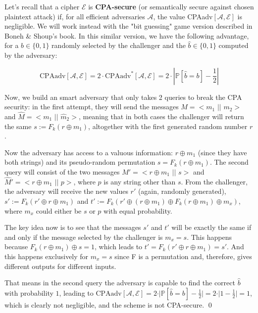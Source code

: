 Let's recall that a cipher $\mathcal{E}$ is \textbf{CPA-secure} (or semantically secure against chosen plaintext attack) if, for all efficient adversaries $\mathcal{A}$, the value CPAadv$[\mathcal{A}, \mathcal{E}]$ is negligible.
We will work instead with the "bit guessing" game version described in Boneh \& Shoup's book. In this similar version, we have the following advantage, for a $b \in \{0, 1\}$ randomly selected by the challenger and the $\hat b \in \{0, 1\}$ computed by the adversary:

\begin{equation*}
    \text{CPAadv}[\mathcal{A}, \mathcal{E}] = 2 \cdot \text{CPAadv}^{*}[\mathcal{A}, \mathcal{E}] = 2 \cdot \left| \mathbb{P}[\hat{b} = b] - \frac{1}{2} \right|
\end{equation*}

Now, we build an smart adversary that only takes 2 queries to break the CPA security: in the first attempt, they will send the messages $M = <m_1$ $\vert \vert$ $m_2>$ and $\hat M = <m_1$ $\vert \vert$ $\hat m_2>$, meaning that in both cases the challenger will return the same $s := F_k (r \oplus m_1)$, altogether with the first generated random number $r$.

Now the adversary has access to a valuous information: $r \oplus m_1$ (since they have both strings) and its pseudo-random permutation $s = F_k (r \oplus m_1)$.
The second query will consist of the two messages $M' = <r \oplus m_1$ $\vert \vert$ $s>$ and $\hat M' = <r \oplus m_1$ $\vert \vert$ $p>$, where $p$ is any string other than $s$.
From the challenger, the adversary will receive the new values $r'$ (again, randomly generated), $s' := F_k(r' \oplus r \oplus m_1)$ and $t' := F_k(r' \oplus (r \oplus m_1) \oplus F_k (r \oplus m_1) \oplus m_x)$, where $m_x$ could either be $s$ or $p$ with equal probability.

The key idea now is to see that the messages $s'$ and $t'$ will be exactly the same if and only if the message selected by the challenger is $m_x = s$.
This happens because $F_k(r \oplus m_1) \oplus s = 1$, which leads to $t' = F_k(r' \oplus r \oplus m_1) = s'$.
And this happens exclusively for $m_x = s$ since F is a permutation and, therefore, gives different outputs for different inputs.

That means in the second query the adversary is capable to find the correct $\hat b$ with probability $1$, leading to $\text{CPAadv}[\mathcal{A}, \mathcal{E}] = 2 \cdot \vert \mathbb{P}[\hat{b} = b] - \frac{1}{2} \vert = 2 \cdot \vert 1 - \frac{1}{2} \vert = 1$, which is clearly not negligible, and the scheme is not CPA-secure. \hfill \qed


